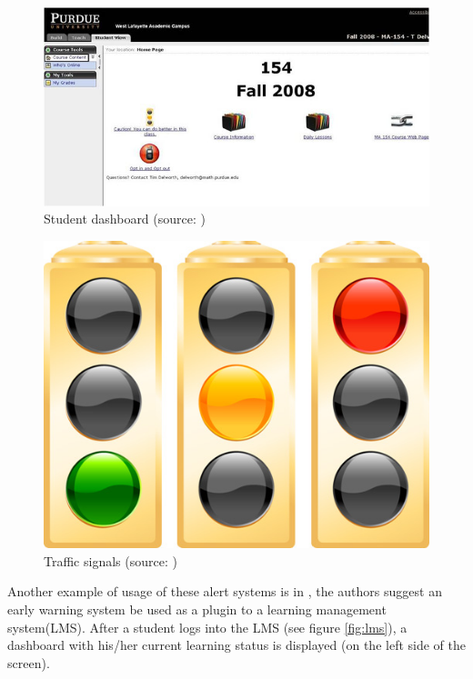 \begin{figure}[htb]
	\centering
  	\includegraphics[scale=1]{Imagens/signals1.jpg}
  	\caption{Student dashboard (source: \cite{arnold2010signals})}
  	\label{fig:s1}
\end{figure}

\begin{figure}[htb]
	\centering
  	\includegraphics[scale=.3]{Imagens/signals2.jpg}
  	\caption{Traffic signals (source: \cite{arnold2010signals})}
  	\label{fig:s2}
\end{figure}

Another example of usage of these alert systems is in \cite{shi2014developing}, the authors suggest an early warning system be used as a plugin to a learning management system(LMS). After a student logs into the LMS (see figure \ref{fig:lms}), a dashboard with his/her current learning status is displayed (on the left side of the screen).

